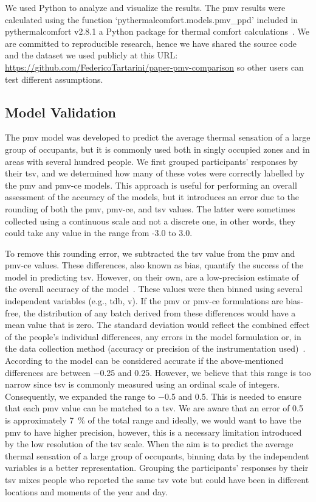 We used Python to analyze and visualize the results.
The \ac{pmv} results were calculated using the function `pythermalcomfort.models.pmv\_ppd' included in pythermalcomfort v2.8.1 a Python package for thermal comfort calculations~\cite{Tartarini2020a}.
We are committed to reproducible research, hence we have shared the source code and the dataset we used publicly at this URL: \url{https://github.com/FedericoTartarini/paper-pmv-comparison} so other users can test different assumptions.

\subsection{Model Validation}\label{subsec:model-validation}
The \ac{pmv} model was developed to predict the average thermal sensation of a large group of occupants, but it is commonly used both in singly occupied zones and in areas with several hundred people.
We first grouped participants' responses by their \ac{tsv}, and we determined how many of these votes were correctly labelled by the \ac{pmv} and \ac{pmv-ce} models.
This approach is useful for performing an overall assessment of the accuracy of the models, but it introduces an error due to the rounding of both the \ac{pmv}, \ac{pmv-ce}, and \ac{tsv} values.
The latter were sometimes collected using a continuous scale and not a discrete one, in other words, they could take any value in the range from -3.0 to 3.0.

To remove this rounding error, we subtracted the \ac{tsv} value from the \ac{pmv} and \ac{pmv-ce} values.
These differences, also known as bias, quantify the success of the model in predicting \ac{tsv}.
However, on their own, are a low-precision estimate of the overall accuracy of the model~\cite{Humphreys2002}.
These values were then binned using several independent variables (e.g., \ac{tdb}, \ac{v}).
If the \ac{pmv} or \ac{pmv-ce} formulations are bias-free, the distribution of any batch derived from these differences would have a mean value that is zero.
The standard deviation would reflect the combined effect of the people's individual differences, any errors in the model formulation or, in the data collection method (accuracy or precision of the instrumentation used)~\cite{Humphreys2002}.
According to  the model can be considered accurate if the above-mentioned differences are between \num{-0.25} and \num{0.25}.
However, we believe that this range is too narrow since \ac{tsv} is commonly measured using an ordinal scale of integers.
Consequently, we expanded the range to \num{-.5} and \num{0.5}.
This is needed to ensure that each \ac{pmv} value can be matched to a \ac{tsv}.
We are aware that an error of \num{.5} is approximately \qty{7}{\percent} of the total range and ideally, we would want to have the \ac{pmv} to have higher precision, however, this is a necessary limitation introduced by the low resolution of the \ac{tsv} scale.
When the aim is to predict the average thermal sensation of a large group of occupants, binning data by the independent variables is a better representation.
Grouping the participants' responses by their \ac{tsv} mixes people who reported the same \ac{tsv} vote but could have been in different locations and moments of the year and day.


